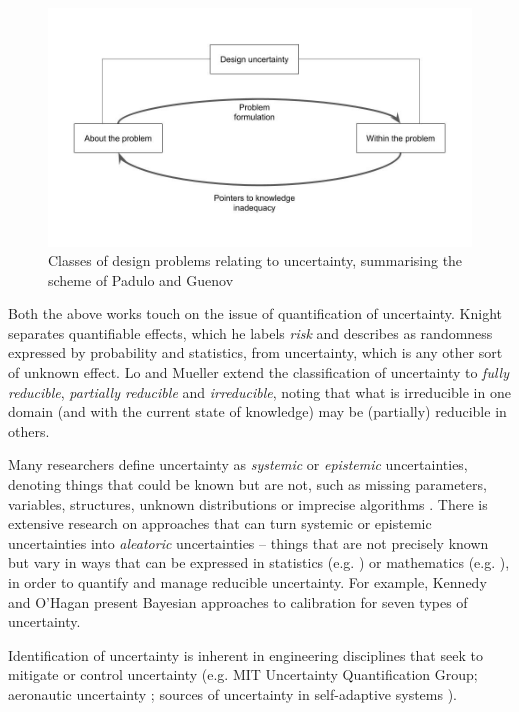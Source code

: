 \documentclass[sigconf,authordraft]{acmart}
\begin{document}
\begin{figure}[ht]
    \centering
    \includegraphics[width=\columnwidth]{design.jpg}
    \caption{Classes of design problems relating to uncertainty, summarising the scheme of Padulo and Guenov \cite{unc-ced}}
    \label{fig:design}
\end{figure}

Both the above works touch on the issue of quantification of uncertainty. Knight \cite{knight2012risk} separates quantifiable effects, which he labels \emph{risk} and describes as randomness expressed by probability and statistics, from uncertainty, which is any other sort of unknown effect.  Lo and Mueller \cite{physEnvy} extend the classification of uncertainty to \emph{fully reducible}, \emph{partially reducible} and \emph{irreducible}, noting that what is irreducible in one domain (and with the current state of knowledge) may be (partially) reducible in others.  

Many researchers define uncertainty as \emph{systemic} or \emph{epistemic} uncertainties, denoting things that could be known but are not, such as missing parameters, variables, structures, unknown distributions or imprecise algorithms \cite{unc-schunn}.  There is extensive research on approaches that can turn systemic or epistemic uncertainties into \emph{aleatoric} uncertainties -- things that are not precisely known but vary in ways that can be expressed in statistics (e.g. \citet{unc-bayes}) or mathematics (e.g. \cite{unc-ober,unc-PATELLI}), in order to quantify and manage reducible uncertainty. For example, Kennedy and O'Hagan \cite{kennedyBayes} present Bayesian approaches to calibration for seven types of uncertainty.  

Identification of uncertainty is inherent in engineering disciplines that seek to mitigate or control uncertainty (e.g. MIT Uncertainty Quantification Group;  aeronautic uncertainty \cite{unc-Park,unc-ZHEHAN,unc-SCHAFFER}; sources of uncertainty in self-adaptive systems \cite{Esfahani2013}).
\end{document}
